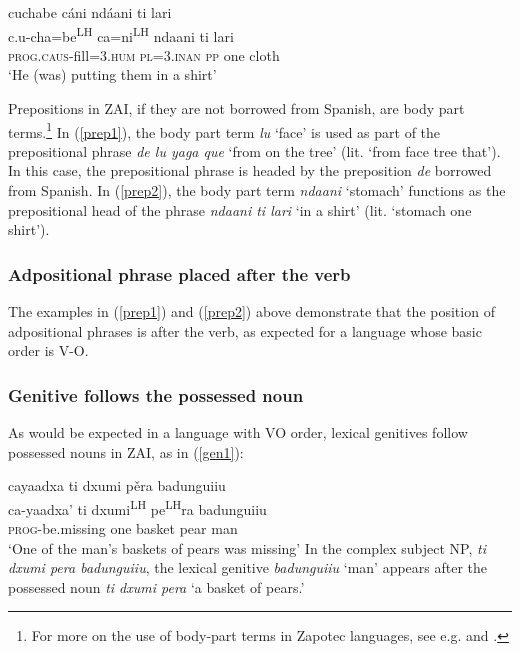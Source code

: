 \ea\label{prep2}
\glll cuchabe c\'{a}ni nd\'{a}ani ti lari \\
c.u-cha=be\textsuperscript{LH} ca=ni\textsuperscript{LH} ndaani ti lari \\
\textsc{prog.caus}-fill=\textsc{3.hum} \textsc{pl=3.inan} \textsc{pp} one cloth \\
\glt `He (was) putting them in a shirt'		
\z

Prepositions in ZAI, if they are not borrowed from Spanish, are body part terms.\footnote{For more on the use of body-part terms in Zapotec languages, see e.g. \citet{maclaury1989} and \citet{perez2011b}.} In (\ref{prep1}), the body part term \textit{lu} `face' is used as part of the prepositional phrase \textit{de lu yaga que} `from on the tree' (lit. `from face tree that'). In this case, the prepositional phrase is headed by the preposition \textit{de} borrowed from Spanish. In (\ref{prep2}), the body part term \textit{ndaani} `stomach' functions as the prepositional head of the phrase \textit{ndaani ti lari} `in a shirt' (lit. `stomach one shirt').


\subsubsection{Adpositional phrase placed after the verb}

The examples in (\ref{prep1}) and (\ref{prep2}) above demonstrate that the position of adpositional phrases is after the verb, as expected for a language whose basic order is V-O.



\subsubsection{Genitive follows the possessed noun}

As would be expected in a language with VO order, lexical genitives follow possessed nouns in ZAI, as in (\ref{gen1}): 

\ea\label{gen1}
\glll cayaadxa ti dxumi p\v{e}ra badunguiiu \\
ca-yaadxa' ti dxumi\textsuperscript{LH} pe\textsuperscript{LH}ra badunguiiu \\
\textsc{prog}-be.missing one basket pear man \\
\glt `One of the man's baskets of pears was missing'
\z
In the complex subject NP, \textit{ti dxumi pera badunguiiu}, the lexical genitive \textit{badunguiiu} `man' appears after the possessed noun \textit{ti dxumi pera} `a basket of pears.'

